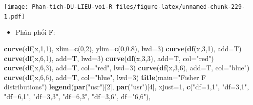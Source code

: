 \documentclass[
]{book}
\newenvironment{Shaded}{\begin{snugshade}}{\end{snugshade}}
\newcommand{\DataTypeTok}[1]{\textcolor[rgb]{0.13,0.29,0.53}{#1}}
\newcommand{\DecValTok}[1]{\textcolor[rgb]{0.00,0.00,0.81}{#1}}
\newcommand{\FloatTok}[1]{\textcolor[rgb]{0.00,0.00,0.81}{#1}}
\newcommand{\KeywordTok}[1]{\textcolor[rgb]{0.13,0.29,0.53}{\textbf{#1}}}
\newcommand{\NormalTok}[1]{#1}
\newcommand{\StringTok}[1]{\textcolor[rgb]{0.31,0.60,0.02}{#1}}
\providecommand{\tightlist}{%
  \setlength{\itemsep}{0pt}\setlength{\parskip}{0pt}}
\begin{document}
\texttt{[image: Phan-tich-DU-LIEU-voi-R\_files/figure-latex/unnamed-chunk-229-1.pdf]}

\begin{itemize}
\tightlist
\item
  Phân phối F:
\end{itemize}

\begin{Shaded}
\begin{Highlighting}[]
\KeywordTok{curve}\NormalTok{(}\KeywordTok{df}\NormalTok{(x,}\DecValTok{1}\NormalTok{,}\DecValTok{1}\NormalTok{), }\DataTypeTok{xlim=}\KeywordTok{c}\NormalTok{(}\DecValTok{0}\NormalTok{,}\DecValTok{2}\NormalTok{), }\DataTypeTok{ylim=}\KeywordTok{c}\NormalTok{(}\DecValTok{0}\NormalTok{,}\FloatTok{0.8}\NormalTok{), }\DataTypeTok{lwd=}\DecValTok{3}\NormalTok{)}
\KeywordTok{curve}\NormalTok{(}\KeywordTok{df}\NormalTok{(x,}\DecValTok{3}\NormalTok{,}\DecValTok{1}\NormalTok{), }\DataTypeTok{add=}\NormalTok{T)}
\KeywordTok{curve}\NormalTok{(}\KeywordTok{df}\NormalTok{(x,}\DecValTok{6}\NormalTok{,}\DecValTok{1}\NormalTok{), }\DataTypeTok{add=}\NormalTok{T, }\DataTypeTok{lwd=}\DecValTok{3}\NormalTok{)}
\KeywordTok{curve}\NormalTok{(}\KeywordTok{df}\NormalTok{(x,}\DecValTok{3}\NormalTok{,}\DecValTok{3}\NormalTok{), }\DataTypeTok{add=}\NormalTok{T, }\DataTypeTok{col=}\StringTok{"red"}\NormalTok{)}
\KeywordTok{curve}\NormalTok{(}\KeywordTok{df}\NormalTok{(x,}\DecValTok{6}\NormalTok{,}\DecValTok{3}\NormalTok{), }\DataTypeTok{add=}\NormalTok{T, }\DataTypeTok{col=}\StringTok{"red"}\NormalTok{, }\DataTypeTok{lwd=}\DecValTok{3}\NormalTok{)}
\KeywordTok{curve}\NormalTok{(}\KeywordTok{df}\NormalTok{(x,}\DecValTok{3}\NormalTok{,}\DecValTok{6}\NormalTok{), }\DataTypeTok{add=}\NormalTok{T, }\DataTypeTok{col=}\StringTok{"blue"}\NormalTok{)}
\KeywordTok{curve}\NormalTok{(}\KeywordTok{df}\NormalTok{(x,}\DecValTok{6}\NormalTok{,}\DecValTok{6}\NormalTok{), }\DataTypeTok{add=}\NormalTok{T, }\DataTypeTok{col=}\StringTok{"blue"}\NormalTok{, }\DataTypeTok{lwd=}\DecValTok{3}\NormalTok{)}
\KeywordTok{title}\NormalTok{(}\DataTypeTok{main=}\StringTok{"Fisher F distributions"}\NormalTok{)}
\KeywordTok{legend}\NormalTok{(}\KeywordTok{par}\NormalTok{(}\StringTok{"usr"}\NormalTok{)[}\DecValTok{2}\NormalTok{], }\KeywordTok{par}\NormalTok{(}\StringTok{"usr"}\NormalTok{)[}\DecValTok{4}\NormalTok{], }
         \DataTypeTok{xjust=}\DecValTok{1}\NormalTok{, }
         \KeywordTok{c}\NormalTok{(}\StringTok{"df=1,1"}\NormalTok{, }\StringTok{"df=3,1"}\NormalTok{, }\StringTok{"df=6,1"}\NormalTok{, }\StringTok{"df=3,3"}\NormalTok{, }
           \StringTok{"df=6,3"}\NormalTok{, }\StringTok{"df=3,6"}\NormalTok{, }\DataTypeTok{df=}\StringTok{"6,6"}\NormalTok{), }

\end{Highlighting}
\end{Shaded}
\end{document}
